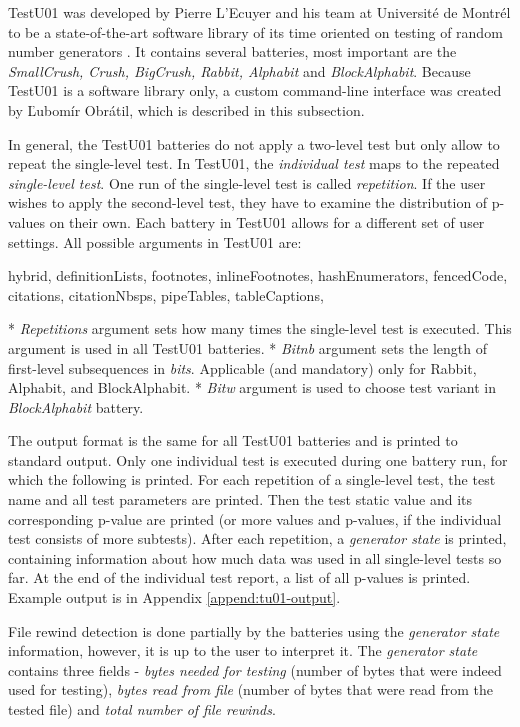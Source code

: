 \documentclass[
  digital,     %
  oneside,     %
  nosansbold,  %
  nocolorbold, %
  nolof,         %
  nolot,         %
]{fithesis4}
\begin{document}
TestU01 \cite{tu01_site} was developed by Pierre L'Ecuyer and his team at Université de Montrél to be a state-of-the-art software library of its time oriented on testing of random number generators \cite{tu01_paper}. It contains several batteries, most important are the \emph{SmallCrush, Crush, BigCrush, Rabbit, Alphabit} and \emph{BlockAlphabit}. Because TestU01 is a software library only, a custom command-line interface \cite{rtt-batteries} was created by Ľubomír Obrátil, which is described in this subsection.

In general, the TestU01 batteries do not apply a two-level test but only allow to repeat the single-level test. In TestU01, the \emph{individual test} maps to the repeated \emph{single-level test}. One run of the single-level test is called \emph{repetition}. If the user wishes to apply the second-level test, they have to examine the distribution of p-values on their own. Each battery in TestU01 allows for a different set of user settings. All possible arguments in TestU01 are:
\begin{markdown*}{%
  hybrid,
  definitionLists,
  footnotes,
  inlineFootnotes,
  hashEnumerators,
  fencedCode,
  citations,
  citationNbsps,
  pipeTables,
  tableCaptions,
}

* \emph{Repetitions} argument sets how many times the single-level test is executed. This argument is used in all TestU01 batteries.
* \emph{Bit\textunderscore nb} argument sets the length of first-level subsequences in \emph{bits}. Applicable (and mandatory) only for Rabbit, Alphabit, and BlockAlphabit.
* \emph{Bit\textunderscore w} argument is used to choose test variant in \emph{BlockAlphabit} battery.
\end{markdown*}

The output format is the same for all TestU01 batteries and is printed to standard output. Only one individual test is executed during one battery run, for which the following is printed. For each repetition of a single-level test, the test name and all test parameters are printed. Then the test static value and its corresponding p-value are printed (or more values and p-values, if the individual test consists of more subtests). After each repetition, a \emph{generator state} is printed, containing information about how much data was used in all single-level tests so far. At the end of the individual test report, a list of all p-values is printed. Example output is in Appendix \ref{append:tu01-output}.

File rewind detection is done partially by the batteries using the \emph{generator state} information, however, it is up to the user to interpret it. The \emph{generator state} contains three fields - \emph{bytes needed for testing} (number of bytes that were indeed used for testing), \emph{bytes read from file} (number of bytes that were read from the tested file) and \emph{total number of file rewinds}. 
\end{document}
